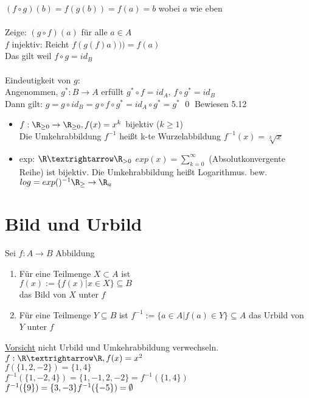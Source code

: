 $(f\circ g)(b)=f(g(b))=f(a)=b$ wobei $a$ wie eben\\ \\
%
Zeige: $(g \circ f) (a) $ für alle $a \in A$\\
$f$ injektiv: Reicht $f(g(f)a))) = f(a)$\\
Das gilt weil $f \circ g = id_B$ \ok \\ \\
Eindeutigkeit von $g$:\\
Angenommen, $g^* : B \to A$ erfüllt $g^* \circ f = id_A$,
$f \circ g^* = id_B$ \\
%
Dann gilt: $g=g\circ id_B=g\circ f\circ g^*=id_A\circ g^* = g^*$ \qed
\bsp
Bewiesen 5.12
\begin{itemize}
\item{$f: \R_{\geq 0} \to \R_{\geq 0}, f(x) = x^k$ bijektiv ($k \geq 1$)\\
Die Umkehrabbildung $f^{-1}$ heißt k-te Wurzelabbildung $f^{-1}(x) = \sqrt[k]{x}$ }
%
\item{exp: $\R→\R_{>0}$ $exp(x) = \sum_{k=0}^{\infty}$ (Absolutkonvergente Reihe) ist bijektiv. Die Umkehrabbildung heißt Logarithmus. bew.
$log = exp()^{-1} \R_{\geq } \to \R_a$ }
\end{itemize}
%
\section*{Bild und Urbild}
Sei $f:A→B$ Abbildung\\
\begin{enumerate}
\item{Für eine Teilmenge $X \subset A$ ist \\
$f(x) := \{f(x) | x \in X\} \subseteq B$ \\
das Bild von $X$ unter $f$}
\item{Für eine Teilmenge $Y \subseteq B$ ist $f^{-1}:=\{a\in A|f(a)\in Y\}\subseteq A$ das Urbild von $Y$ unter $f$}
\end{enumerate}
\underline{\underline{Vorsicht}} nicht Urbild und Umkehrabbildung verwechseln.\\
\bsp
$f:\R→\R, f(x)=x^2$\\
$f(\{1, 2, -2\}) = \{1, 4\}$\\
$f^{-1}(\{1,-2,4\})=\{1,-1,2,-2\}=f^{-1}(\{1,4\})$\\
$f^{-1}(\{9\})=\{3,-3\} \\
f^{-1}(\{-5\})=\emptyset$
%
